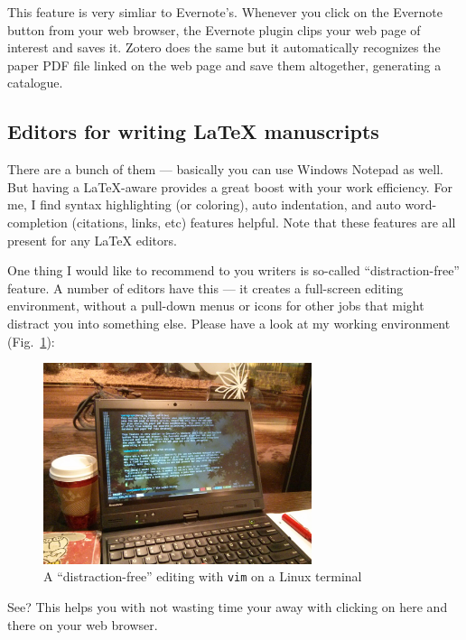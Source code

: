 \documentclass[11pt]{article}
\begin{document}
This feature is very simliar to Evernote's. Whenever you click on the Evernote
button from your web browser, the Evernote plugin clips your web page of
interest and saves it. Zotero does the same but it automatically recognizes
the paper PDF file linked on the web page and save them altogether, 
generating a catalogue.

\subsection{Editors for writing LaTeX manuscripts}

There are a bunch of them --- basically you can use Windows Notepad as well.
But having a LaTeX-aware provides a great boost with your work efficiency. For
me, I find syntax highlighting (or coloring), auto indentation, and auto
word-completion (citations, links, etc)  features helpful. Note that these
features are all present for any LaTeX editors.

One thing I would like to recommend to you writers is so-called
``distraction-free'' feature. A number of editors have this --- it creates a
full-screen editing environment, without a pull-down menus or icons for other
jobs that might distract you into something else. Please have a look at my
working environment (Fig.~\ref{fig:distraction-free}):

\begin{figure}[h]
    \begin{center}
        \includegraphics[width=0.7\textwidth]{figure/distract-free-shot}
    \end{center}
    \caption{A ``distraction-free'' editing with \texttt{vim} on a Linux
        terminal}
    \label{fig:distraction-free}
\end{figure}

See? This helps you with not wasting time your away with clicking on here and
there on your web browser. 
\end{document}
